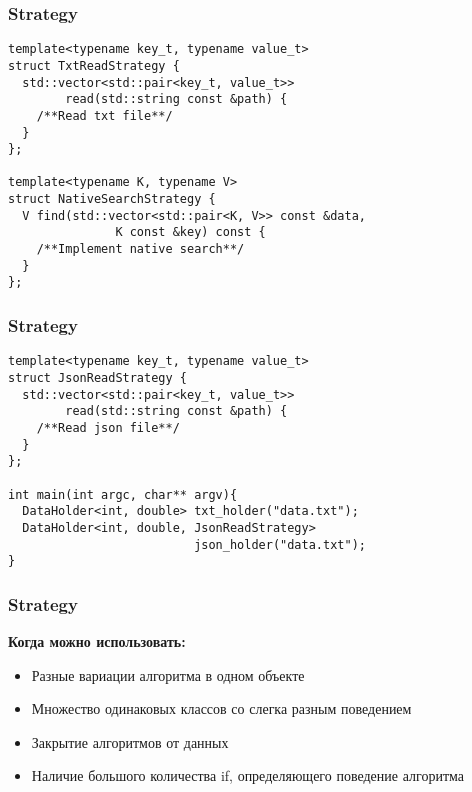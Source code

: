 \begin{frame}[fragile]
  \frametitle{Strategy}
  \begin{verbatim}
template<typename key_t, typename value_t>
struct TxtReadStrategy {
  std::vector<std::pair<key_t, value_t>> 
        read(std::string const &path) {
    /**Read txt file**/
  }
};

template<typename K, typename V>
struct NativeSearchStrategy {
  V find(std::vector<std::pair<K, V>> const &data, 
               K const &key) const {
    /**Implement native search**/
  }
};
  \end{verbatim} 
\end{frame}

\begin{frame}[fragile]
  \frametitle{Strategy}
  \begin{verbatim}
template<typename key_t, typename value_t>
struct JsonReadStrategy {
  std::vector<std::pair<key_t, value_t>> 
        read(std::string const &path) {
    /**Read json file**/
  }
};

int main(int argc, char** argv){
  DataHolder<int, double> txt_holder("data.txt");
  DataHolder<int, double, JsonReadStrategy> 
                          json_holder("data.txt");
}
  \end{verbatim} 
\end{frame}

\begin{frame}
  \frametitle{Strategy}
  \textbf{Когда можно использовать:}
  \begin{itemize}
    \item Разные вариации алгоритма в одном объекте
    \item Множество одинаковых классов со слегка разным поведением
    \item Закрытие алгоритмов от данных
    \item Наличие большого количества if, определяющего поведение алгоритма
  \end{itemize}
\end{frame}

